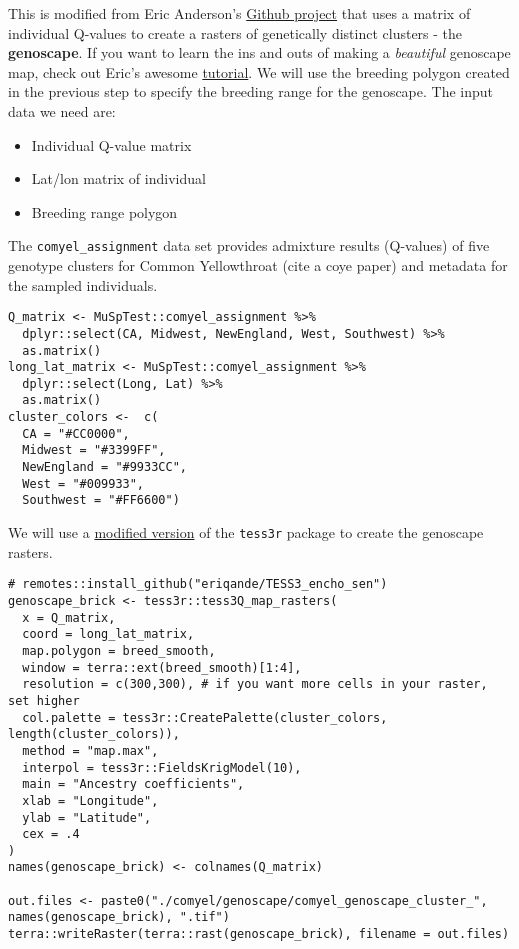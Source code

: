 \documentclass[
]{book}
\providecommand{\tightlist}{%
  \setlength{\itemsep}{0pt}\setlength{\parskip}{0pt}}
\begin{document}
This is modified from Eric Anderson's \href{https://github.com/eriqande/make-a-BGP-map}{Github project} that uses a matrix of individual Q-values to create a rasters of genetically distinct clusters - the \textbf{genoscape}. If you want to learn the ins and outs of making a \emph{beautiful} genoscape map, check out Eric's awesome \href{https://github.com/eriqande/make-a-BGP-map}{tutorial}. We will use the breeding polygon created in the previous step to specify the breeding range for the genoscape. The input data we need are:

\begin{itemize}
\tightlist
\item
  Individual Q-value matrix
\item
  Lat/lon matrix of individual
\item
  Breeding range polygon
\end{itemize}

The \texttt{comyel\_assignment} data set provides admixture results (Q-values) of five genotype clusters for Common Yellowthroat (cite a coye paper) and metadata for the sampled individuals.

\begin{verbatim}
Q_matrix <- MuSpTest::comyel_assignment %>%
  dplyr::select(CA, Midwest, NewEngland, West, Southwest) %>%
  as.matrix()
long_lat_matrix <- MuSpTest::comyel_assignment %>%
  dplyr::select(Long, Lat) %>%
  as.matrix()
cluster_colors <-  c(
  CA = "#CC0000",
  Midwest = "#3399FF",
  NewEngland = "#9933CC",
  West = "#009933",
  Southwest = "#FF6600") 
\end{verbatim}

We will use a \href{https://github.com/eriqande/TESS3_encho_sen}{modified version} of the \texttt{tess3r} package to create the genoscape rasters.

\begin{verbatim}
# remotes::install_github("eriqande/TESS3_encho_sen")
genoscape_brick <- tess3r::tess3Q_map_rasters(
  x = Q_matrix, 
  coord = long_lat_matrix,  
  map.polygon = breed_smooth,
  window = terra::ext(breed_smooth)[1:4],
  resolution = c(300,300), # if you want more cells in your raster, set higher
  col.palette = tess3r::CreatePalette(cluster_colors, length(cluster_colors)), 
  method = "map.max", 
  interpol = tess3r::FieldsKrigModel(10),  
  main = "Ancestry coefficients",
  xlab = "Longitude", 
  ylab = "Latitude", 
  cex = .4
)
names(genoscape_brick) <- colnames(Q_matrix)

out.files <- paste0("./comyel/genoscape/comyel_genoscape_cluster_", names(genoscape_brick), ".tif")
terra::writeRaster(terra::rast(genoscape_brick), filename = out.files)
\end{verbatim}
\end{document}
